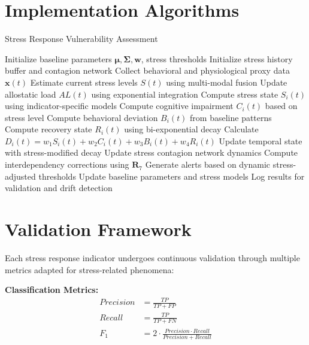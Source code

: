 \documentclass[11pt,a4paper]{article}
\begin{document}
\section{Implementation Algorithms}

\begin{algorithm}
\caption{Stress Response Vulnerability Assessment}
\begin{algorithmic}[1]
\STATE Initialize baseline parameters $\boldsymbol{\mu}, \boldsymbol{\Sigma}, \boldsymbol{w}$, stress thresholds
\STATE Initialize stress history buffer and contagion network
    \STATE Collect behavioral and physiological proxy data $\mathbf{x}(t)$
    \STATE Estimate current stress levels $S(t)$ using multi-modal fusion
    \STATE Update allostatic load $AL(t)$ using exponential integration
        \STATE Compute stress state $S_i(t)$ using indicator-specific models
        \STATE Compute cognitive impairment $C_i(t)$ based on stress level
        \STATE Compute behavioral deviation $B_i(t)$ from baseline patterns
        \STATE Compute recovery state $R_i(t)$ using bi-exponential decay
        \STATE Calculate $D_i(t) = w_1 S_i(t) + w_2 C_i(t) + w_3 B_i(t) + w_4 R_i(t)$
        \STATE Update temporal state with stress-modified decay
    \ENDFOR
    \STATE Update stress contagion network dynamics
    \STATE Compute interdependency corrections using $\mathbf{R}_7$
    \STATE Generate alerts based on dynamic stress-adjusted thresholds
    \STATE Update baseline parameters and stress models
    \STATE Log results for validation and drift detection
\ENDFOR
\end{algorithmic}
\end{algorithm}

\section{Validation Framework}

Each stress response indicator undergoes continuous validation through multiple metrics adapted for stress-related phenomena:

\textbf{Classification Metrics:}
\begin{align}
Precision &= \frac{TP}{TP + FP} \\
Recall &= \frac{TP}{TP + FN} \\
F_1 &= 2 \cdot \frac{Precision \cdot Recall}{Precision + Recall}
\end{align}
\end{document}
